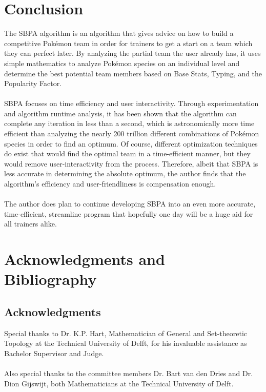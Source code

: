 \documentclass{article}
\begin{document}
\section{Conclusion}
The SBPA algorithm is an algorithm that gives advice on how to build a competitive Pok\'emon team in order for trainers to get a start on a team which they can perfect later. By analyzing the partial team the user already has, it uses simple mathematics to analyze Pok\'emon species on an individual level and determine the best potential team members based on Base Stats, Typing, and the Popularity Factor.\\\\
SBPA focuses on time efficiency and user interactivity. Through experimentation and algorithm runtime analysis, it has been shown that the algorithm can complete any iteration in less than a second, which is astronomically more time efficient than analyzing the nearly 200 trillion different combinations of Pok\'emon species in order to find an optimum. Of course, different optimization techniques do exist that would find the optimal team in a time-efficient manner, but they would remove user-interactivity from the process. Therefore, albeit that SBPA is less accurate in determining the absolute optimum, the author finds that the algorithm's efficiency and user-friendliness is compensation enough.\\\\
The author does plan to continue developing SBPA into an even more accurate, time-efficient, streamline program that hopefully one day will be a huge aid for all trainers alike.

\newpage
\section{Acknowledgments and Bibliography}
\subsection{Acknowledgments}
Special thanks to Dr. K.P. Hart, Mathematician of General and Set-theoretic Topology at the Technical University of Delft, for his invaluable assistance as Bachelor Supervisor and Judge.\\\\
Also special thanks to the committee members Dr. Bart van den Dries and Dr. Dion Gijswijt, both Mathematicians at the Technical University of Delft.
\end{document}

